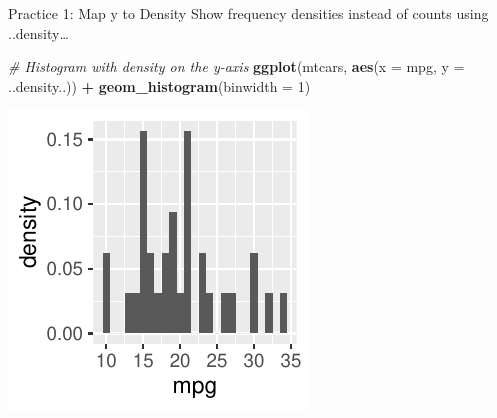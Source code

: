 \documentclass[
  ignorenonframetext,
]{beamer}
\newenvironment{Shaded}{\begin{snugshade}}{\end{snugshade}}
\newcommand{\AttributeTok}[1]{\textcolor[rgb]{0.13,0.29,0.53}{#1}}
\newcommand{\CommentTok}[1]{\textcolor[rgb]{0.56,0.35,0.01}{\textit{#1}}}
\newcommand{\DecValTok}[1]{\textcolor[rgb]{0.00,0.00,0.81}{#1}}
\newcommand{\FunctionTok}[1]{\textcolor[rgb]{0.13,0.29,0.53}{\textbf{#1}}}
\newcommand{\NormalTok}[1]{#1}
\newcommand{\SpecialCharTok}[1]{\textcolor[rgb]{0.81,0.36,0.00}{\textbf{#1}}}
\begin{document}
\begin{frame}[fragile]{Practice 1: Map y to Density}
\label{practice-1-map-y-to-density}
Show frequency densities instead of counts using ..density\ldots{}


\begin{Shaded}
\begin{Highlighting}[]
\CommentTok{\# Histogram with density on the y{-}axis}
\FunctionTok{ggplot}\NormalTok{(mtcars, }\FunctionTok{aes}\NormalTok{(}\AttributeTok{x =}\NormalTok{ mpg, }\AttributeTok{y =}\NormalTok{ ..density..)) }\SpecialCharTok{+} \FunctionTok{geom\_histogram}\NormalTok{(}\AttributeTok{binwidth =} \DecValTok{1}\NormalTok{)}
\end{Highlighting}
\end{Shaded}

\begin{center}\includegraphics[width=0.5\linewidth]{Figs/unnamed-chunk-39-1} \end{center}
\end{frame}
\end{document}
